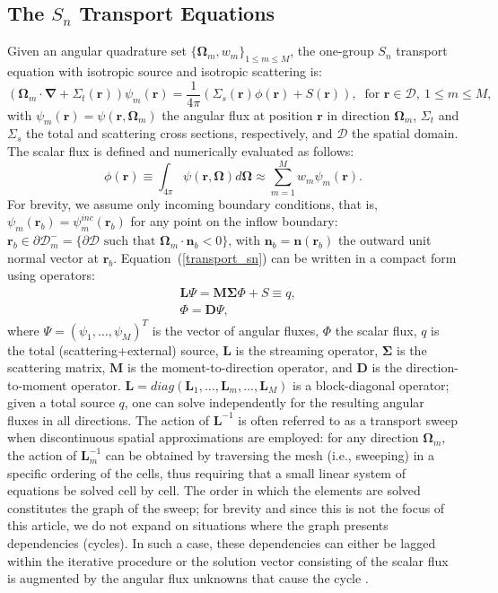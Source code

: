 \documentclass[preprint,10pt]{elsarticle}
\newcommand\bn{\boldsymbol{\nabla}}
\newcommand\bo{\boldsymbol{\Omega}}
\newcommand\br{\mathbf{r}}
\newcommand\bs{\boldsymbol}
\newcommand\mc{\mathcal}
\renewcommand{\(}{\left(}
\renewcommand{\)}{\right)}
\renewcommand{\[}{\left[}
\renewcommand{\]}{\right]}
\newcommand{\sn}{\ensuremath{S_n}\xspace}
\begin{document}
\subsection{The \sn Transport Equations}
Given an angular quadrature set $\{\bo _m,w_m\}_{1\leq m \leq M}$, the one-group
\sn transport equation with isotropic source and isotropic scattering is:
\begin{equation}
  \( \bo_m\cdot \bn + \Sigma_t(\br) \) \psi_m (\br) = \frac{1}{4\pi} \left( \Sigma_s
  (\br) \phi(\br) + S (\br) \right), \ \textrm{ for } \br \in \mc{D},\
  1 \leq m \leq M,
  \label{transport_sn}
\end{equation}
with $\psi_m(\br) = \psi(\br,\bo_m)$ the angular flux at position $\br$ in
direction $\bo_m$, $\Sigma_t$ and $\Sigma_s$ the total and scattering cross
sections, respectively, and $\mc{D}$ the spatial domain. The scalar flux is
defined and numerically evaluated as follows:
\begin{equation}
  \phi(\br) \equiv \int_{4\pi} \psi(\br,\bo) d\bo \approx \sum_{m=1}^M w_m
  \psi_m (\br).
\end{equation}
For brevity, we assume only incoming boundary conditions, that is, $\psi_m(\br_b) =
\psi_m^{inc}(\br_b)$ for any point on the inflow boundary: $\br_b \in \partial \mc{D}_m^-
= \{\partial \mc{D} \textrm{ such that }\bo_m \cdot \bs{n}_b <0\}$, with
$\bs{n}_b = \bs{n}(\br_b)$ the outward unit normal vector at $\br_b$. 
Equation~\textup {(\ref {transport_sn})} can be written in a compact form using operators:
\begin{align}
  & \bs{L} \Psi = \bs{M \Sigma}\Phi + S \equiv q, \label{L_Psi}\\
  &\Phi = \bs{D} \Psi, \label{Phi}
\end{align}
where $\Psi=(\psi_1,\ldots,\psi_M)^T$ is the vector of angular fluxes, $\Phi$ the scalar flux,
$q$ is the total (scattering+external) source, $\bs{L}$ is the streaming
operator, $\bs{\Sigma}$ is the scattering matrix, $\bs{M}$ is the
moment-to-direction operator, and $\bs{D}$ is the direction-to-moment
operator. $\bs{L} = diag(\bs{L}_1,\hdots,\bs{L}_m,\hdots,\bs{L}_M)$ is 
a block-diagonal operator; given a total source $q$, one can solve independently 
for the resulting angular
fluxes in all directions. The action of $\bs{L}^{-1}$ is often referred to as
a transport sweep when discontinuous spatial approximations are
employed:  for any direction $\bo_m$, the action of $\bs{L}_m^{-1}$ can
be obtained by traversing the mesh (i.e., sweeping) in a specific ordering of
the cells, thus requiring that a small linear system of equations be solved 
cell by cell. The order in which the elements are solved constitutes the graph
of the sweep; for brevity and since this is not the focus of this article,
we do not expand on situations where the graph presents dependencies
(cycles). In such a case, these dependencies can either be lagged within the
iterative procedure \cite{dgfem} or the solution vector consisting of the scalar 
flux is augmented by the angular flux unknowns that cause the cycle \cite{mip}.
\end{document}
